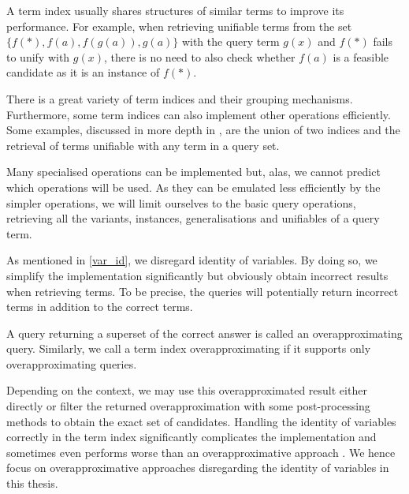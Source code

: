 
A term index usually shares structures of similar terms to improve its performance. For example, when retrieving unifiable terms from the set $\{f(*), f(a), f(g(a)), g(a)\}$ with the query term $g(x)$ and $f(*)$ fails to unify with $g(x)$, there is no need to also check whether $f(a)$ is a feasible candidate as it is an instance of $f(*)$.

There is a great variety of term indices and their grouping mechanisms. Furthermore, some term indices can also implement other operations efficiently. Some examples, discussed in more depth in \cite{carbonell_comparison_1995}, are the union of two indices and the retrieval of terms unifiable with any term in a query set.

Many specialised operations can be implemented but, alas, we cannot predict which operations will be used. As they can be emulated less efficiently by the simpler operations, we will limit ourselves to the basic query operations, retrieving all the variants, instances, generalisations and unifiables of a query term.

As mentioned in \cref{var_id}, we disregard identity of variables. By doing so, we simplify the implementation significantly but obviously obtain incorrect results when retrieving terms. To be precise, the queries will potentially return incorrect terms in addition to the correct terms.

\begin{defn}
  A query returning a superset of the correct answer is called an overapproximating query. Similarly, we call a term index overapproximating if it supports only overapproximating queries.
\end{defn}

Depending on the context, we may use this overapproximated result either directly or filter the returned overapproximation with some post-processing methods to obtain the exact set of candidates. Handling the identity of variables correctly in the term index significantly complicates the implementation and sometimes even performs worse than an overapproximative approach \cite{carbonell_comparison_1995}. We hence focus on overapproximative approaches disregarding the identity of variables in this thesis.
